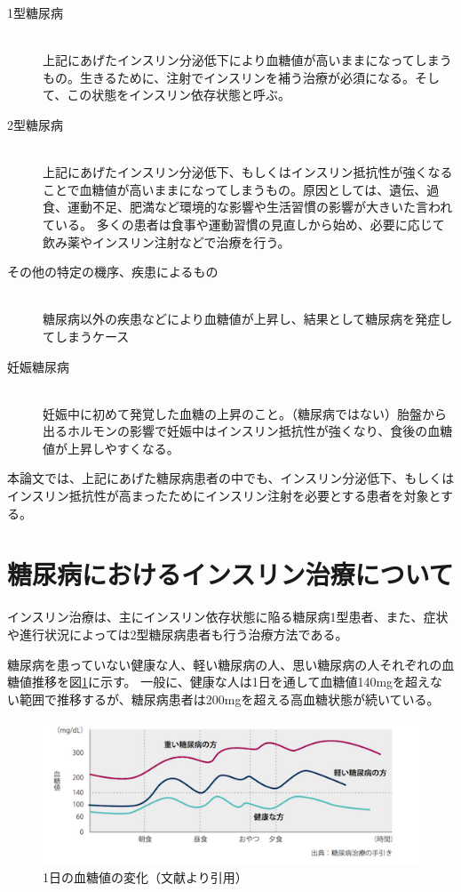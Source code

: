 \begin{description}
  \item [1型糖尿病]\mbox{}\\
    上記にあげたインスリン分泌低下により血糖値が高いままになってしまうもの。生きるために、注射でインスリンを補う治療が必須になる。そして、この状態をインスリン依存状態と呼ぶ。
  \item [2型糖尿病]\mbox{}\\
    上記にあげたインスリン分泌低下、もしくはインスリン抵抗性が強くなることで血糖値が高いままになってしまうもの。原因としては、遺伝、過食、運動不足、肥満など環境的な影響や生活習慣の影響が大きいた言われている。
    多くの患者は食事や運動習慣の見直しから始め、必要に応じて飲み薬やインスリン注射などで治療を行う。
  \item [その他の特定の機序、疾患によるもの]\mbox{}\\
    糖尿病以外の疾患などにより血糖値が上昇し、結果として糖尿病を発症してしまうケース
  \item [妊娠糖尿病]\mbox{}\\
    妊娠中に初めて発覚した血糖の上昇のこと。（糖尿病ではない）胎盤から出るホルモンの影響で妊娠中はインスリン抵抗性が強くなり、食後の血糖値が上昇しやすくなる。
\end{description}

本論文では、上記にあげた糖尿病患者の中でも、インスリン分泌低下、もしくはインスリン抵抗性が高まったためにインスリン注射を必要とする患者を対象とする。

\section{糖尿病におけるインスリン治療について}
\label{subsubsection:insulin_treatment}

インスリン治療は、主にインスリン依存状態に陥る糖尿病1型患者、また、症状や進行状況によっては2型糖尿病患者も行う治療方法である。\cite{insulin_treatment_method}

糖尿病を患っていない健康な人、軽い糖尿病の人、思い糖尿病の人それぞれの血糖値推移を図\ref{fig:suger_in_blood_change}に示す。
一般に、健康な人は1日を通して血糖値140mgを超えない範囲で推移するが、糖尿病患者は200mgを超える高血糖状態が続いている。

\begin{figure}[htbp]
  \caption{1日の血糖値の変化（文献\cite{suger_in_blood_change}より引用）}
  \label{fig:suger_in_blood_change}
  \begin{center}
    \includegraphics[bb=0 0 500 200,width=15cm]{assets/suger_in_blood_change.png}
  \end{center}
\end{figure}

